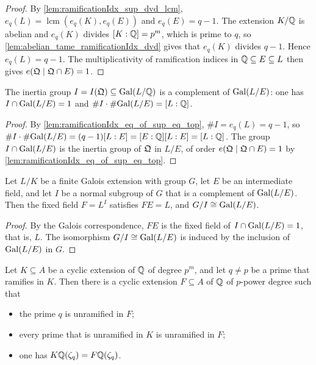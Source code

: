 \begin{proof}
  \leanok
  By \ref{lem:ramificationIdx_sup_dvd_lcm}, $e_q(L) = \operatorname{lcm}(e_q(K), e_q(E))$ and
  $e_q(E) = q - 1$. The extension $K/\mathbb{Q}$ is abelian and $e_q(K)$ divides $[K:\mathbb{Q}] = p^m$, which
  is prime to $q$, so \ref{lem:abelian_tame_ramificationIdx_dvd} gives that $e_q(K)$ divides
  $q - 1$. Hence $e_q(L) = q - 1$. The multiplicativity of ramification indices in
  $\mathbb{Q} \subseteq E \subseteq L$ then gives $e(\mathfrak{Q} \mid \mathfrak{Q}\cap E) = 1$.
\end{proof}

\begin{lemma}
  \label{lem:inertia_isComplement_fixingSubgroup}
  \leanok
  The inertia group $I = I(\mathfrak{Q}) \subseteq \mathrm{Gal}(L/\mathbb{Q})$ is a complement of $\mathrm{Gal}(L/E)$: one has
  $I \cap \mathrm{Gal}(L/E) = 1$ and $\#I \cdot \#\mathrm{Gal}(L/E) = [L:\mathbb{Q}]$.
\end{lemma}

\begin{proof}
  \leanok
  By \ref{lem:ramificationIdx_eq_of_sup_eq_top}, $\#I = e_q(L) = q - 1$, so $\#I \cdot
  \#\mathrm{Gal}(L/E) = (q-1)[L:E] = [E:\mathbb{Q}][L:E] = [L:\mathbb{Q}]$. The group $I \cap \mathrm{Gal}(L/E)$ is the inertia
  group of $\mathfrak{Q}$ in $L/E$, of order $e(\mathfrak{Q} \mid \mathfrak{Q}\cap E) = 1$ by
  \ref{lem:ramificationIdx_eq_of_sup_eq_top}.
\end{proof}

\begin{lemma}
  \label{lem:inertia_field_from_complement}
  \leanok
  Let $L/K$ be a finite Galois extension with group $G$, let $E$ be an intermediate field, and let
  $I$ be a normal subgroup of $G$ that is a complement of $\mathrm{Gal}(L/E)$. Then the fixed field
  $F = L^{I}$ satisfies $FE = L$, and $G/I \cong \mathrm{Gal}(L/E)$.
\end{lemma}

\begin{proof}
  \leanok
  By the Galois correspondence, $FE$ is the fixed field of $I \cap \mathrm{Gal}(L/E) = 1$, that is, $L$.
  The isomorphism $G/I \cong \mathrm{Gal}(L/E)$ is induced by the inclusion of $\mathrm{Gal}(L/E)$ in $G$.
\end{proof}

\begin{lemma}
  \label{lem:kw_ramification_reduction}
  \leanok
  Let $K \subseteq A$ be a cyclic extension of $\mathbb{Q}$ of degree $p^m$, and let $q \neq p$ be a prime
  that ramifies in $K$. Then there is a cyclic extension $F \subseteq A$ of $\mathbb{Q}$ of $p$-power
  degree such that
  \begin{itemize}
    \item the prime $q$ is unramified in $F$;
    \item every prime that is unramified in $K$ is unramified in $F$;
    \item one has $K\mathbb{Q}(\zeta_q) = F\mathbb{Q}(\zeta_q)$.
  \end{itemize}
\end{lemma}

